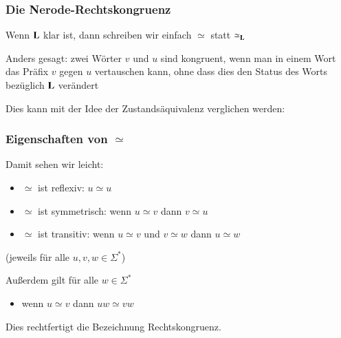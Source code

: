 \documentclass[onlymath]{beamer}
\begin{document}
\begin{frame}\frametitle{Die Nerode-Rechtskongruenz}

Wenn $\textbf{\textcolor{black}{L}}$ klar ist, dann schreiben wir einfach $\simeq$ statt $\simeq_{\textbf{\textcolor{black}{L}}}$

\pause\medskip

\alert{Anders gesagt:} zwei Wörter $v$ und $u$ sind kongruent, wenn man in einem Wort das Präfix $v$ gegen $u$ vertauschen kann, ohne dass dies den Status des Worts bezüglich $\textbf{\textcolor{black}{L}}$ verändert
\bigskip

Dies kann mit der Idee der Zustandsäquivalenz verglichen werden:


\end{frame}

\begin{frame}\frametitle{Eigenschaften von $\simeq$}

%
\smallskip\pause

Damit sehen wir leicht:
\begin{itemize}
\item $\simeq$ ist \alert{reflexiv}: $u\simeq u$
\item $\simeq$ ist \alert{symmetrisch}: wenn $u\simeq v$ dann $v\simeq u$
\item $\simeq$ ist \alert{transitiv}: wenn $u\simeq v$ und $v\simeq w$ dann $u\simeq w$
\end{itemize}
(jeweils für alle $u,v,w\in \Sigma^*$)
\medskip

%
\smallskip\pause

Außerdem gilt für alle $w\in\Sigma^*$
\begin{itemize}
\item wenn $u\simeq v$ dann $uw\simeq vw$
\end{itemize}
\smallskip

%
\smallskip

Dies rechtfertigt die Bezeichnung \alert{Rechtskongruenz}.

\end{frame}
\end{document}
